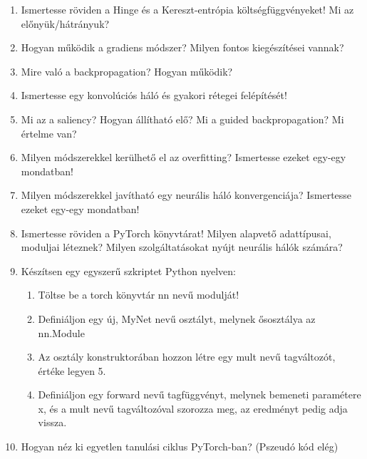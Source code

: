 \documentclass[12pt,a4paper,oneside]{report}             %
\begin{document}
\begin{enumerate}
\item Ismertesse röviden a Hinge és a Kereszt-entrópia költségfüggvényeket! Mi az előnyük/hátrányuk?
\item Hogyan működik a gradiens módszer? Milyen fontos kiegészítései vannak?
\item Mire való a backpropagation? Hogyan működik?
\item Ismertesse egy konvolúciós háló és gyakori rétegei felépítését!
\item Mi az a saliency? Hogyan állítható elő? Mi a guided backpropagation? Mi értelme van?
\item Milyen módszerekkel kerülhető el az overfitting? Ismertesse ezeket egy-egy mondatban!
\item Milyen módszerekkel javítható egy neurális háló konvergenciája? Ismertesse ezeket egy-egy mondatban!
\item Ismertesse röviden a PyTorch könyvtárat! Milyen alapvető adattípusai, moduljai léteznek? Milyen szolgáltatásokat nyújt neurális hálók számára?
\item Készítsen egy egyszerű szkriptet Python nyelven: 
\begin{enumerate}
\item Töltse be a torch könyvtár nn nevű modulját!
\item Definiáljon egy új, MyNet nevű osztályt, melynek ősosztálya az nn.Module
\item Az osztály konstruktorában hozzon létre egy mult nevű tagváltozót, értéke legyen 5.
\item Definiáljon egy forward nevű tagfüggvényt, melynek bemeneti paramétere x, és a mult nevű tagváltozóval szorozza meg, az eredményt pedig adja vissza.
\end{enumerate}
\item Hogyan néz ki egyetlen tanulási ciklus PyTorch-ban? (Pszeudó kód elég)
\end{enumerate}


\printbibliography
\end{document}
